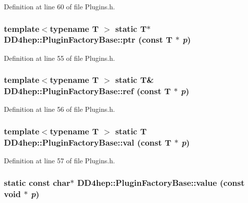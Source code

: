 Definition at line 60 of file Plugins.h.\hypertarget{struct_d_d4hep_1_1_plugin_factory_base_aa33c408b5e8b5958dd374b9df33ccf18}{
\subsubsection[{ptr}]{\setlength{\rightskip}{0pt plus 5cm}template$<$typename T $>$ static {\bf T}$\ast$ DD4hep::PluginFactoryBase::ptr (const {\bf T} $\ast$ {\em p})}}
\label{struct_d_d4hep_1_1_plugin_factory_base_aa33c408b5e8b5958dd374b9df33ccf18}


Definition at line 55 of file Plugins.h.\hypertarget{struct_d_d4hep_1_1_plugin_factory_base_a3bdd1fb899c61e38fcf8c64e4f5b7578}{
\subsubsection[{ref}]{\setlength{\rightskip}{0pt plus 5cm}template$<$typename T $>$ static {\bf T}\& DD4hep::PluginFactoryBase::ref (const {\bf T} $\ast$ {\em p})}}
\label{struct_d_d4hep_1_1_plugin_factory_base_a3bdd1fb899c61e38fcf8c64e4f5b7578}


Definition at line 56 of file Plugins.h.\hypertarget{struct_d_d4hep_1_1_plugin_factory_base_a261416ecf4b5243bd84bb429401f6255}{
\subsubsection[{val}]{\setlength{\rightskip}{0pt plus 5cm}template$<$typename T $>$ static {\bf T} DD4hep::PluginFactoryBase::val (const {\bf T} $\ast$ {\em p})}}
\label{struct_d_d4hep_1_1_plugin_factory_base_a261416ecf4b5243bd84bb429401f6255}


Definition at line 57 of file Plugins.h.\hypertarget{struct_d_d4hep_1_1_plugin_factory_base_a8adc43989827d1bc0a6d079b3e64f756}{
\subsubsection[{value}]{\setlength{\rightskip}{0pt plus 5cm}static const char$\ast$ DD4hep::PluginFactoryBase::value (const void $\ast$ {\em p})}}
\label{struct_d_d4hep_1_1_plugin_factory_base_a8adc43989827d1bc0a6d079b3e64f756}


